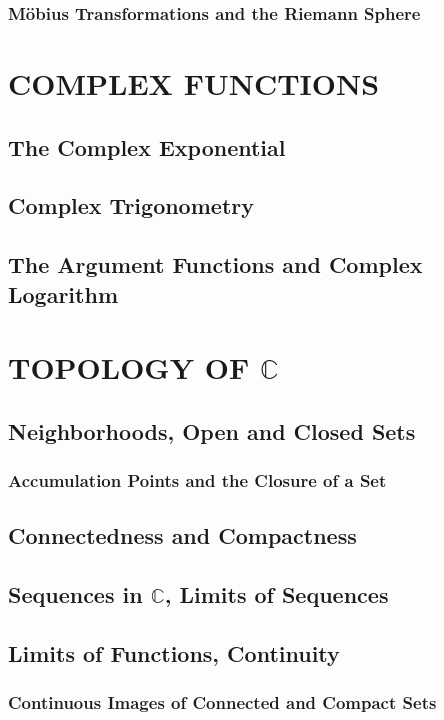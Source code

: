 \documentclass[hidelinks,12pt]{article}
\theoremstyle{definition}
\begin{document}
  \subsubsection{Möbius Transformations and the Riemann Sphere}


  \section{COMPLEX FUNCTIONS}
  \subsection{The Complex Exponential}
  \subsection{Complex Trigonometry}
  \subsection{The Argument Functions and Complex Logarithm}


  \section{TOPOLOGY OF $\mathbb{C}$}
  \subsection{Neighborhoods, Open and Closed Sets}
  \subsubsection{Accumulation Points and the Closure of a Set}
  \subsection{Connectedness and Compactness}
  \subsection{Sequences in $\mathbb{C}$, Limits of Sequences}
  \subsection{Limits of Functions, Continuity}
  \subsubsection{Continuous Images of Connected and Compact Sets}
\end{document}

